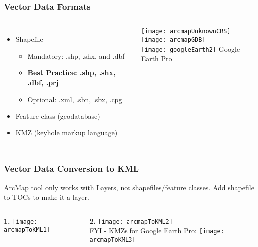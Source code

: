 \documentclass[t]{beamer} %
\begin{document}
\begin{frame}
\frametitle{Vector Data Formats}

\begin{columns}[t]
\begin{itemize}
\item Shapefile
\begin{itemize}
	\item Mandatory: .shp, .shx, and .dbf
	\item \textbf{Best Practice: .shp, .shx, .dbf, .prj}
	\item Optional: .xml, .sbn, .sbx, .cpg
\end{itemize}
\vspace{0.4in}
\item Feature class (geodatabase)
\vspace{0.4in}
\item KMZ (keyhole markup language)
\end{itemize}

\texttt{[image: arcmapUnknownCRS]}\\
\vspace{0.3in}
\texttt{[image: arcmapGDB]}\\
\vspace{0.2in}
\texttt{[image: googleEarth2]} \hspace{0.1in} \small{Google Earth Pro}
\end{columns}
\end{frame}


\begin{frame}
\frametitle{Vector Data Conversion to KML}
\scriptsize{ArcMap tool only works with Layers, not shapefiles/feature classes. Add shapefile to TOCs to make it a layer.}
\normalsize

\begin{columns}[t]
\textbf{1.} \texttt{[image: arcmapToKML1]} 

\textbf{2.} \texttt{[image: arcmapToKML2]}\\
\vspace{0.1in}
FYI - KMZs for Google Earth Pro:
\vspace{-0.2in}
\texttt{[image: arcmapToKML3]}
\end{columns}
\end{frame}
\end{document}
